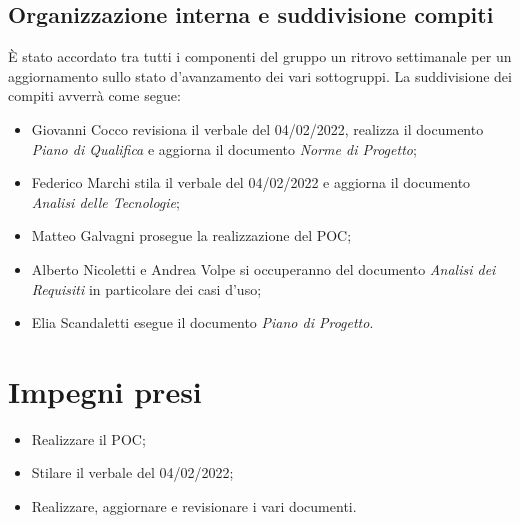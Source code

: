 \documentclass[a4paper, 12pt]{article}
\begin{document}
\subsection{Organizzazione interna e suddivisione compiti}
È stato accordato tra tutti i componenti del gruppo un ritrovo settimanale per un aggiornamento sullo stato d'avanzamento dei vari sottogruppi. La suddivisione dei compiti avverrà come segue:
\begin{itemize}
    \item Giovanni Cocco revisiona il verbale del 04/02/2022, realizza il documento \textit{Piano di Qualifica} e aggiorna il documento \textit{Norme di Progetto};
    \item Federico Marchi stila il verbale del 04/02/2022 e aggiorna il documento \textit{Analisi delle Tecnologie};
    \item Matteo Galvagni prosegue la realizzazione del POC;
    \item Alberto Nicoletti e Andrea Volpe si occuperanno del documento \textit{Analisi dei Requisiti} in particolare dei casi d'uso;
    \item Elia Scandaletti esegue il documento \textit{Piano di Progetto}.
\end{itemize}

\section{Impegni presi}
\begin{itemize}
\item Realizzare il POC;
\item Stilare il verbale del 04/02/2022;
\item Realizzare, aggiornare e revisionare i vari documenti.
\end{itemize}
\end{document}
